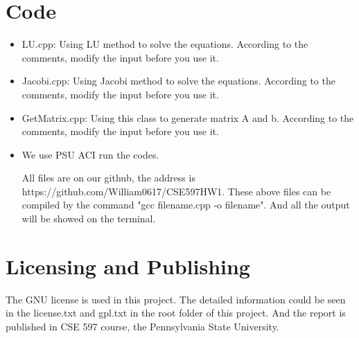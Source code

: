\documentclass{article}
\begin{document}
\begin{spacing}{1.1}
\begin{appendices}
\section{Code}

\begin{itemize}
    \item LU.cpp: Using LU method to solve the equations. According to the comments, modify the input before you use it.
    \item Jacobi.cpp: Using Jacobi method to solve the equations. According to the comments, modify the input before you use it.
    \item GetMatrix.cpp: Using this class to generate matrix A and b. According to the comments, modify the input before you use it.
    \item We use PSU ACI run the codes.
    
    All files are on our github, the address is https://github.com/William0617/CSE597HW1.
    These above files can be compiled by the command "gcc filename.cpp -o filename". And all the output will be showed on the terminal.
\end{itemize}

\section{Licensing and Publishing}

\begin{itemize}
    The GNU license is used in this project. The detailed information could be seen in the license.txt and gpl.txt in the root folder of this project.\newline
    And the report is published in CSE 597 course, the Pennsylvania State University. 
\end{itemize}
\end{appendices}








\end{spacing}
\end{document}
